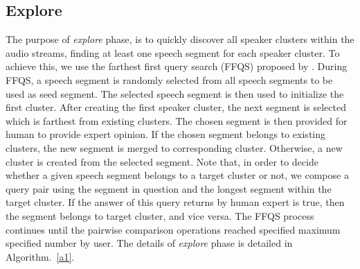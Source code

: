 \documentclass[journal,10pt]{IEEEtran}
\begin{document}
\subsection{Explore}
The purpose of \textit{explore} phase, is to quickly discover all speaker clusters within the audio streams, finding at least one speech segment for each speaker cluster. To achieve this, we use the farthest first query search (FFQS) proposed by \cite{basu2004active}. During FFQS, a speech segment is randomly selected from all speech segments to be used as seed segment. The selected speech segment is then used to initialize the first cluster. After creating the first speaker cluster, the next segment is selected which is farthest from existing clusters. The chosen segment is then provided for human to provide expert opinion. If the chosen segment belongs to existing clusters, the new segment is merged to corresponding cluster. Otherwise, a new cluster is created from the selected segment. Note that, in order to decide whether a given speech segment belongs to a target cluster or not, we compose a query pair using the segment in question and the longest segment within the target cluster. If the answer of this query returns by human expert is true, then the segment belongs to target cluster, and vice versa. The FFQS process continues until the pairwise comparison operations reached specified maximum specified number by user. The details of \textit{explore} phase is detailed in Algorithm.~\ref{a1}.  
\end{document}
